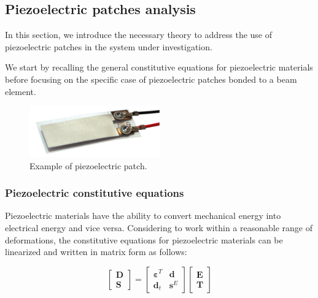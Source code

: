 \subsection{Piezoelectric patches analysis}
\label{subsec:piezoelectric_patches_analysis}

In this section, we introduce the necessary theory to address the use of piezoelectric patches in the system under investigation.

We start by recalling the general constitutive equations for piezoelectric materials before focusing on the specific case of piezoelectric patches bonded to a beam element.

\begin{figure}[H]
    \centering
    \includegraphics[width=0.5\textwidth]{img/piezo.jpg}
    \caption{Example of piezoelectric patch.}
    \label{fig:piezo}
\end{figure}


\subsubsection{Piezoelectric constitutive equations}
\label{subsubsec:piezoelectric_constitutive_equations}

Piezoelectric materials have the ability to convert mechanical energy into electrical energy and vice versa.
Considering to work within a reasonable range of deformations, the constitutive equations for piezoelectric materials can be linearized and written in matrix form as follows:

\begin{equation}
    \begin{bmatrix}
        \bm{D} \\
        \bm{S}
    \end{bmatrix} =
    \begin{bmatrix}
        \bm{\varepsilon}^T & \bm{d}   \\
        \bm{d}_t           & \bm{s}^E
    \end{bmatrix}
    \begin{bmatrix}
        \bm{E} \\
        \bm{T}
    \end{bmatrix}
\end{equation}

